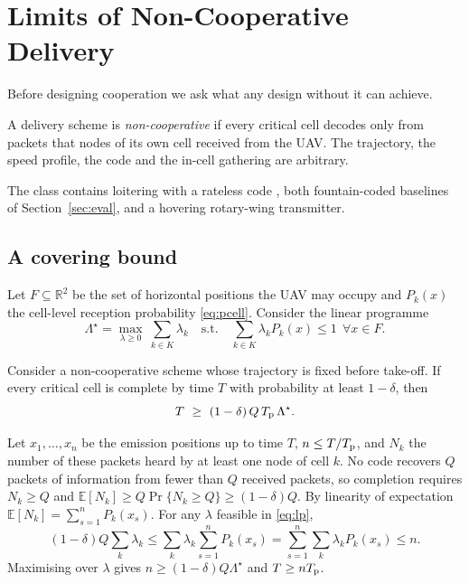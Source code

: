 \section{Limits of Non-Cooperative Delivery}\label{sec:limits}
Before designing cooperation we ask what any design without it can achieve.

\begin{definition}
A delivery scheme is \emph{non-cooperative} if every critical cell decodes only from packets that nodes of its own cell
received from the UAV. The trajectory, the speed profile, the code and the in-cell gathering are arbitrary.
\end{definition}
The class contains loitering with a rateless code \cite{zeng2018multicast}, both fountain-coded baselines of
Section~\ref{sec:eval}, and a hovering rotary-wing transmitter.

\subsection{A covering bound}
Let $F\subseteq\mathbb{R}^2$ be the set of horizontal positions the UAV may occupy and $P_k(x)$ the cell-level reception
probability \eqref{eq:pcell}. Consider the linear programme
\begin{equation}
\Lambda^\star=\max_{\lambda\ge0}\ \sum_{k\in K}\lambda_k\quad\text{s.t.}\quad \sum_{k\in K}\lambda_kP_k(x)\le1\ \ \forall x\in F.
\label{eq:lp}
\end{equation}
\begin{theorem}\label{thm:cover}
Consider a non-cooperative scheme whose trajectory is fixed before take-off. If every critical cell is complete by time
$T$ with probability at least $1-\delta$, then
\begin{equation}
T\ \ge\ (1-\delta)\,Q\,\Tp\,\Lambda^\star .\label{eq:cover}
\end{equation}
\end{theorem}
\begin{IEEEproof}
Let $x_1,\dots,x_n$ be the emission positions up to time $T$, $n\le T/T_{\mathrm p}$, and $N_k$ the number of these packets heard
by at least one node of cell $k$. No code recovers $Q$ packets of information from fewer than $Q$ received packets, so
completion requires $N_k\ge Q$ and $\mathbb{E}[N_k]\ge Q\Pr\{N_k\ge Q\}\ge(1-\delta)Q$. By linearity of expectation
$\mathbb{E}[N_k]=\sum_{s=1}^nP_k(x_s)$. For any $\lambda$ feasible in \eqref{eq:lp},
\[
(1-\delta)Q\sum_k\lambda_k\le\sum_k\lambda_k\!\sum_{s=1}^n\!P_k(x_s)=\sum_{s=1}^n\sum_k\lambda_kP_k(x_s)\le n .
\]
Maximising over $\lambda$ gives $n\ge(1-\delta)Q\Lambda^\star$ and $T\ge nT_{\mathrm p}$.
\end{IEEEproof}

